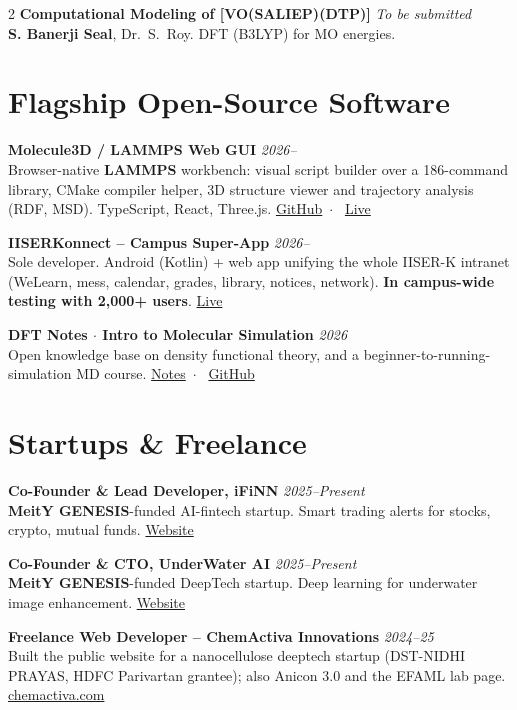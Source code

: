 \documentclass[a4paper,9pt]{article}
\newcommand{\entry}[3]{%
  {\scriptsize\textbf{#1}} \hfill {\tiny\textit{#2}}\\[-0.1em]
  {\tiny #3}\vspace{1.5pt}%
}
\begin{document}
\begin{paracol}{2}
	\entry{Computational Modeling of [VO(SALIEP)(DTP)]}{To be submitted}{%
		\textbf{S. Banerji Seal}, Dr.~S.~Roy. DFT (B3LYP) for MO energies.}

	\section{Flagship Open-Source Software}

	\entry{Molecule3D / LAMMPS Web GUI}{2026--}{%
		Browser-native \textbf{LAMMPS} workbench: visual script builder over a 186-command library, CMake compiler helper, 3D structure viewer and trajectory analysis (RDF, MSD). TypeScript, React, Three.js.
		\href{https://github.com/Shuvam-Banerji-Seal/lammps-web-gui}{\tiny GitHub}~$\cdot$~%
		\href{https://shuvam-banerji-seal.github.io/lammps-web-gui/}{\tiny Live}}

	\entry{IISERKonnect -- Campus Super-App}{2026--}{%
		Sole developer. Android (Kotlin) + web app unifying the whole IISER-K intranet (WeLearn, mess, calendar, grades, library, notices, network). \textbf{In campus-wide testing with 2,000+ users}.
		\href{https://shuvam-banerji-seal.github.io/iiserkonnect-website/}{\tiny Live}}

	\entry{DFT Notes $\cdot$ Intro to Molecular Simulation}{2026}{%
		Open knowledge base on density functional theory, and a beginner-to-running-simulation MD course.
		\href{https://shuvam-banerji-seal.github.io/DFT-notes/}{\tiny Notes}~$\cdot$~%
		\href{https://github.com/Shuvam-Banerji-Seal/introduction-to-molecular-simulation}{\tiny GitHub}}

	\section{Startups \& Freelance}

	\entry{Co-Founder \& Lead Developer, iFiNN}{2025--Present}{%
		\textbf{MeitY GENESIS}-funded AI-fintech startup. Smart trading alerts for stocks, crypto, mutual funds.
		\href{https://synapse-iiserk.github.io/}{\tiny Website}}

	\entry{Co-Founder \& CTO, UnderWater AI}{2025--Present}{%
		\textbf{MeitY GENESIS}-funded DeepTech startup. Deep learning for underwater image enhancement.
		\href{https://underwater-ai.github.io/}{\tiny Website}}

	\entry{Freelance Web Developer -- ChemActiva Innovations}{2024--25}{%
		Built the public website for a nanocellulose deeptech startup (DST-NIDHI PRAYAS, HDFC Parivartan grantee); also Anicon 3.0 and the EFAML lab page.
		\href{https://chemactiva.com/}{\tiny chemactiva.com}}


\end{paracol}
\end{document}
